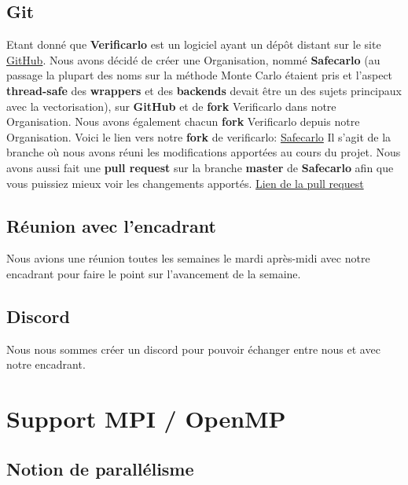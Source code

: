 \documentclass[11pt]{article}
\begin{document}
\subsection{Git}
\label{sec:org89b2786}

Etant donné que \textbf{Verificarlo} est un logiciel ayant un dépôt
distant sur le site \href{https://github.com}{GitHub}. Nous avons décidé de créer une
Organisation, nommé \textbf{Safecarlo} (au passage la plupart des noms sur la
méthode Monte Carlo étaient pris et l'aspect \textbf{thread-safe} des \textbf{wrappers}
et des \textbf{backends} devait être un des sujets principaux avec la
vectorisation), sur \textbf{GitHub} et de \textbf{fork} Verificarlo dans notre
Organisation. Nous avons également chacun \textbf{fork} Verificarlo depuis notre
Organisation.
\vspace{5mm}
Voici le lien vers notre \textbf{fork} de verificarlo: \href{https://github.com/Safecarlo/verificarlo/tree/vectorization}{Safecarlo}
\vspace{5mm}
Il s'agit de la branche où nous avons réuni les modifications
apportées au cours du projet.
\vspace{5mm}
Nous avons aussi fait une \textbf{pull request} sur la branche \textbf{master} de
\textbf{Safecarlo} afin que vous puissiez mieux voir les changements apportés.
\vspace{5mm}
\href{https://github.com/Safecarlo/verificarlo/pull/24}{Lien de la pull request}

\subsection{Réunion avec l'encadrant}
\label{sec:orgb505c3f}

Nous avions une réunion toutes les semaines le mardi après-midi
avec notre encadrant pour faire le point sur l'avancement de la
semaine.

\subsection{Discord}
\label{sec:org58f7e92}

Nous nous sommes créer un discord pour pouvoir échanger entre nous et avec
notre encadrant.

\section{Support MPI / OpenMP}
\label{sec:org35a7e85}
\subsection{Notion de parallélisme}
\label{sec:orgf8784ff}
\end{document}
